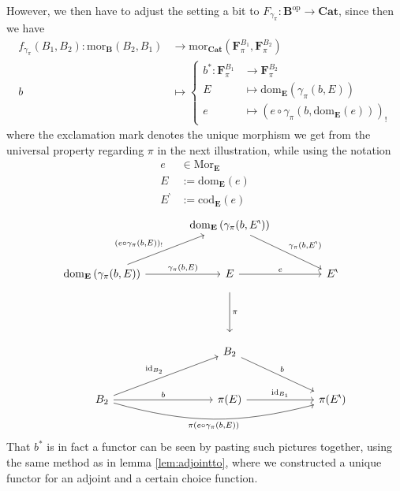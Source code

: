 However, we then have to adjust the setting a bit to $F_{\gamma_{\pi}} \colon \mathbf{B}^{\mathrm{op}} \rightarrow \mathbf{Cat}$, since then we have
\begin{align*}
  f_{\gamma_{\pi}}(B_{1},B_{2})
  \colon
  \mathrm{mor}_{\mathbf{B}}(B_{2},B_{1})
  &\rightarrow
  \mathrm{mor}_{\mathbf{Cat}}
  \left(
    \mathbf{F}_{\pi}^{B_{1}},
    \mathbf{F}_{\pi}^{B_{2}}
  \right)
  \\
  b
  &\mapsto
  \left\lbrace
  \begin{aligned}
    b^{\ast}
    \colon
    \mathbf{F}_{\pi}^{B_{1}}
    &\rightarrow
    \mathbf{F}_{\pi}^{B_{2}}
    \\
    E
    &\mapsto
    \mathrm{dom}_{\mathbf{E}}
    \left(
      \gamma_{\pi}(b,E)
    \right)
    \\
    e
    &\mapsto
    \left(
      e
      \circ
      \gamma_{\pi}(b,\mathrm{dom}_{\mathbf{E}}(e))
    \right)_{!}
  \end{aligned}
  \right.
\end{align*}
where the exclamation mark denotes the unique morphism we get from the universal property regarding $\pi$ in the next illustration, while using the notation
\begin{align*}
  e
  &\in
  \mathrm{Mor}_{\mathbf{E}}
  \\
  E
  &:=
  \mathrm{dom}_{\mathbf{E}}(e)
  \\
  E^{\backprime}
  &:=
  \mathrm{cod}_{\mathbf{E}}(e)
\end{align*}
\[
\begin{tikzcd}[sep=large]
  &
  \mathrm{dom}_{\mathbf{E}}
  \left(
    \gamma_{\pi}(b,E^{\backprime})
  \right)
  \arrow{dr}{\gamma_{\pi}(b,E^{\backprime})}
  &
  \\
  \mathrm{dom}_{\mathbf{E}}
  \left(
    \gamma_{\pi}(b,E)
  \right)
  \arrow{ur}{(e \circ \gamma_{\pi}(b,E))_{!}}
  \arrow{r}{\gamma_{\pi}(b,E)}
  &
  E
  \arrow{r}{e}
  \arrow[shorten <= 10pt, shorten >= 10pt]{dd}{\pi}
  &
  E^{\backprime}
  \\
  &
  &
  \\
  &
  B_{2}
  \arrow{dr}{b}
  &
  \\
  B_{2}
  \arrow{ur}{\mathrm{id}_{B_{2}}}
  \arrow{r}{b}
  \arrow[swap,bend right=15]{rr}{\pi(e \circ \gamma_{\pi}(b,E))}
  &
  \pi(E)
  \arrow{r}{\mathrm{id}_{B_{1}}}
  &
  \pi(E^{\backprime})
\end{tikzcd}
\]
That $b^{\ast}$ is in fact a functor can be seen by pasting such pictures together, using the same method as in lemma \ref{lem:adjointto}, where we constructed a unique functor for an adjoint and a certain choice function.
